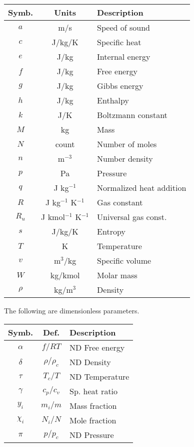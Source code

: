 \vspace{1em}
\begin{tabular}{|ccl|}
\hline
Symb. & Units & Description\\
\hline
$a$ & m/s & Speed of sound\\
$c$ & J/kg/K & Specific heat\\
$e$ & J/kg & Internal energy\\
$f$ & J/kg & Free energy\\
$g$ & J/kg & Gibbs energy\\
$h$ & J/kg & Enthalpy\\
$k$ & J/K & Boltzmann constant\\
$M$ & kg & Mass\\
$N$ & count & Number of moles\\
$n$ & m$^{-3}$ & Number density\\
$p$ & Pa & Pressure\\
$q$ & J kg$^{-1}$ & Normalized heat addition\\
$R$ & J kg$^{-1}$ K$^{-1}$ & Gas constant\\
$R_u$ & J kmol$^{-1}$ K$^{-1}$ & Universal gas const.\\
$s$ & J/kg/K & Entropy\\
$T$ & K & Temperature\\
$v$ & m$^3$/kg & Specific volume\\
$W$ & kg/kmol & Molar mass\\
$\rho$ & kg/m$^3$ & Density\\
\hline
\end{tabular}
\vspace{1em}

The following are dimensionless parameters.

\vspace{1em}
\begin{tabular}{|ccl|}
\hline
Symb. & Def. & Description\\
\hline
$\alpha$ & $f / RT$ & ND Free energy\\
$\delta$ & $\rho/\rho_c$ & ND Density\\
$\tau$ & $T_c / T$ & ND Temperature\\
$\gamma$ & $c_p / c_v$ & Sp. heat ratio\\
$y_i$ & $m_i / m$ & Mass fraction\\
$\chi_i$ & $N_i / N$ & Mole fraction\\
$\pi$ & $p / p_c$ & ND Pressure\\
\hline
\end{tabular}
\vspace{1em}

